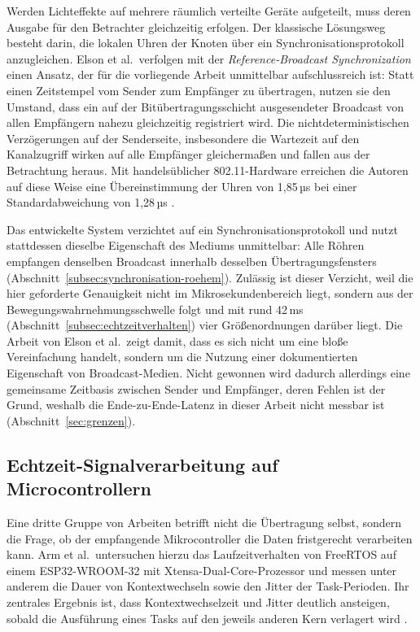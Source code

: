 Werden Lichteffekte auf mehrere räumlich verteilte Geräte aufgeteilt, muss deren
Ausgabe für den Betrachter gleichzeitig erfolgen. Der klassische Lösungsweg besteht
darin, die lokalen Uhren der Knoten über ein Synchronisationsprotokoll anzugleichen.
Elson et al.\ verfolgen mit der \textit{Reference-Broadcast Synchronization} einen
Ansatz, der für die vorliegende Arbeit unmittelbar aufschlussreich ist: Statt einen
Zeitstempel vom Sender zum Empfänger zu übertragen, nutzen sie den Umstand, dass ein
auf der Bitübertragungsschicht ausgesendeter Broadcast von allen Empfängern nahezu
gleichzeitig registriert wird. Die nichtdeterministischen Verzögerungen auf der
Senderseite, insbesondere die Wartezeit auf den Kanalzugriff wirken auf alle
Empfänger gleichermaßen und fallen aus der Betrachtung heraus. Mit handelsüblicher
802.11-Hardware erreichen die Autoren auf diese Weise eine Übereinstimmung der Uhren
von 1,85\,µs bei einer Standardabweichung von 1,28\,µs \cite{elson2002}.

Das entwickelte System verzichtet auf ein Synchronisationsprotokoll und nutzt
stattdessen dieselbe Eigenschaft des Mediums unmittelbar: Alle Röhren empfangen
denselben Broadcast innerhalb desselben Übertragungsfensters
(Abschnitt~\ref{subsec:synchronisation-roehem}). Zulässig ist dieser Verzicht, weil die
hier geforderte Genauigkeit nicht im Mikrosekundenbereich liegt, sondern aus der
Bewegungswahrnehmungsschwelle folgt und mit rund 42\,ms
(Abschnitt~\ref{subsec:echtzeitverhalten}) vier Größenordnungen darüber liegt. Die
Arbeit von Elson et al.\ zeigt damit, dass es sich nicht um eine bloße Vereinfachung
handelt, sondern um die Nutzung einer dokumentierten Eigenschaft von Broadcast-Medien.
Nicht gewonnen wird dadurch allerdings eine gemeinsame Zeitbasis zwischen Sender und
Empfänger, deren Fehlen ist der Grund, weshalb die Ende-zu-Ende-Latenz in dieser Arbeit
nicht messbar ist (Abschnitt~\ref{sec:grenzen}).

\subsection{Echtzeit-Signalverarbeitung auf Microcontrollern}
\label{subsec:forschung-signalverarbeitung}

Eine dritte Gruppe von Arbeiten betrifft nicht die Übertragung selbst, sondern die
Frage, ob der empfangende Mikrocontroller die Daten fristgerecht verarbeiten kann.
Arm et al.\ untersuchen hierzu das Laufzeitverhalten von FreeRTOS auf einem
ESP32-WROOM-32 mit Xtensa-Dual-Core-Prozessor und messen unter anderem die Dauer von
Kontextwechseln sowie den Jitter der Task-Perioden. Ihr zentrales Ergebnis ist, dass
Kontextwechselzeit und Jitter deutlich ansteigen, sobald die Ausführung eines Tasks auf
den jeweils anderen Kern verlagert wird \cite{arm2022}.

